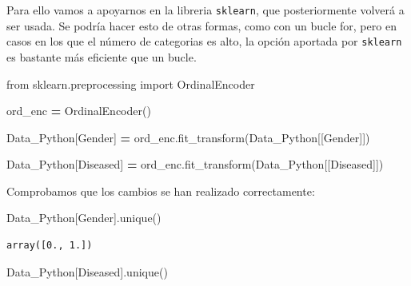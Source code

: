 \documentclass[
  11pt,
  a4paper,
]{article}
\newenvironment{Shaded}{\begin{snugshade}}{\end{snugshade}}
\newcommand{\ImportTok}[1]{#1}
\newcommand{\NormalTok}[1]{#1}
\newcommand{\OperatorTok}[1]{\textcolor[rgb]{0.81,0.36,0.00}{\textbf{#1}}}
\newcommand{\StringTok}[1]{\textcolor[rgb]{0.31,0.60,0.02}{#1}}
\begin{document}
Para ello vamos a apoyarnos en la libreria \texttt{sklearn}, que
posteriormente volverá a ser usada. Se podría hacer esto de otras
formas, como con un bucle for, pero en casos en los que el número de
categorias es alto, la opción aportada por \texttt{sklearn} es bastante
más eficiente que un bucle.

\begin{Shaded}
\begin{Highlighting}[]
\ImportTok{from}\NormalTok{ sklearn.preprocessing }\ImportTok{import}\NormalTok{ OrdinalEncoder}

\NormalTok{ord\_enc }\OperatorTok{=}\NormalTok{ OrdinalEncoder()}
\end{Highlighting}
\end{Shaded}

\begin{Shaded}
\begin{Highlighting}[]
\NormalTok{Data\_Python[}\StringTok{\textquotesingle{}Gender\textquotesingle{}}\NormalTok{] }\OperatorTok{=}\NormalTok{ ord\_enc.fit\_transform(Data\_Python[[}\StringTok{\textquotesingle{}Gender\textquotesingle{}}\NormalTok{]])}

\NormalTok{Data\_Python[}\StringTok{\textquotesingle{}Diseased\textquotesingle{}}\NormalTok{] }\OperatorTok{=}\NormalTok{ ord\_enc.fit\_transform(Data\_Python[[}\StringTok{\textquotesingle{}Diseased\textquotesingle{}}\NormalTok{]])}
\end{Highlighting}
\end{Shaded}

Comprobamos que los cambios se han realizado correctamente:

\begin{Shaded}
\begin{Highlighting}[]
\NormalTok{Data\_Python[}\StringTok{\textquotesingle{}Gender\textquotesingle{}}\NormalTok{].unique()}
\end{Highlighting}
\end{Shaded}

\begin{verbatim}
array([0., 1.])
\end{verbatim}

\begin{Shaded}
\begin{Highlighting}[]
\NormalTok{Data\_Python[}\StringTok{\textquotesingle{}Diseased\textquotesingle{}}\NormalTok{].unique()}
\end{Highlighting}
\end{Shaded}
\end{document}
